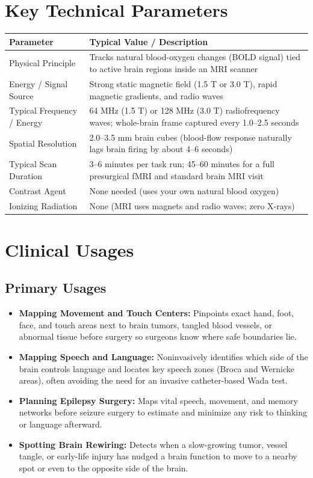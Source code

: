 \section{Key Technical Parameters}

\noindent\begin{tabularx}{\textwidth}{@{}l X@{}}
\toprule
\textbf{Parameter} & \textbf{Typical Value / Description} \\
\midrule
Physical Principle & Tracks natural blood-oxygen changes (BOLD signal) tied to active brain regions inside an MRI scanner \\
Energy / Signal Source & Strong static magnetic field (1.5 T or 3.0 T), rapid magnetic gradients, and radio waves \\
Typical Frequency / Energy & 64 MHz (1.5 T) or 128 MHz (3.0 T) radiofrequency waves; whole-brain frame captured every 1.0--2.5 seconds \\
Spatial Resolution & 2.0--3.5 mm brain cubes (blood-flow response naturally lags brain firing by about 4--6 seconds) \\
Typical Scan Duration & 3--6 minutes per task run; 45--60 minutes for a full presurgical fMRI and standard brain MRI visit \\
Contrast Agent & None needed (uses your own natural blood oxygen) \\
Ionizing Radiation & None (MRI uses magnets and radio waves; zero X-rays) \\
\bottomrule
\end{tabularx}

\section{Clinical Usages}

\subsection{Primary Usages}

\begin{itemize}
    \item \textbf{Mapping Movement and Touch Centers:} Pinpoints exact hand, foot, face, and touch areas next to brain tumors, tangled blood vessels, or abnormal tissue before surgery so surgeons know where safe boundaries lie.
    \item \textbf{Mapping Speech and Language:} Noninvasively identifies which side of the brain controls language and locates key speech zones (Broca and Wernicke areas), often avoiding the need for an invasive catheter-based Wada test.
    \item \textbf{Planning Epilepsy Surgery:} Maps vital speech, movement, and memory networks before seizure surgery to estimate and minimize any risk to thinking or language afterward.
    \item \textbf{Spotting Brain Rewiring:} Detects when a slow-growing tumor, vessel tangle, or early-life injury has nudged a brain function to move to a nearby spot or even to the opposite side of the brain.
\end{itemize}

